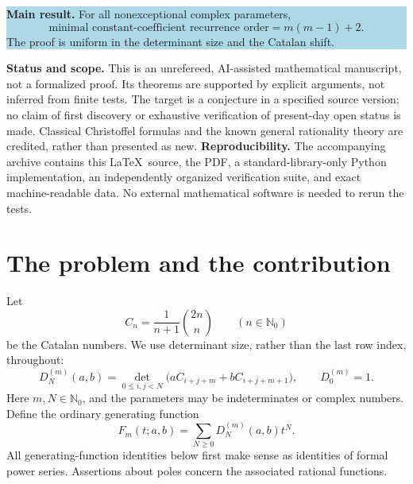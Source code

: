 \documentclass[11pt,a4paper]{article}
\numberwithin{equation}{section}
\theoremstyle{definition}
\theoremstyle{remark}
\newcommand{\NN}{\mathbb N_0}
\newcommand{\D}[2]{D_{#1}^{(#2)}}
\begin{document}
\vspace{1mm}
\noindent\colorbox{lightblue}{\parbox{\dimexpr\textwidth-2\fboxsep\relax}{%
\textbf{Main result.} For all nonexceptional complex parameters,
\[
\boxed{\ \text{minimal constant-coefficient recurrence order}
       =m(m-1)+2.\ }
\]
The proof is uniform in the determinant size and the Catalan shift.
}}\par
\vspace{1mm}
\noindent\textbf{Status and scope.}
This is an unrefereed, AI-assisted mathematical manuscript, not a formalized
proof.  Its theorems are supported by explicit arguments, not inferred from
finite tests.  The target is a conjecture in a specified source version;
no claim of first discovery or exhaustive verification of present-day
open status is made.  Classical Christoffel formulas and the known general
rationality theory are credited, rather than presented as new.
\vfill
\noindent\textbf{Reproducibility.} The accompanying archive contains this
\LaTeX\ source, the PDF, a standard-library-only Python implementation,
an independently organized verification suite, and exact machine-readable
data.  No external mathematical software is needed to rerun the tests.

\clearpage
\begingroup
\small
\setlength{\parskip}{0pt}
\tableofcontents
\endgroup
\clearpage
{}

\section{The problem and the contribution}\label{sec:problem}

Let
\begin{equation}\label{eq:catalan}
 C_n=\frac{1}{n+1}\binom{2n}{n}\qquad(n\in\NN)
\end{equation}
be the Catalan numbers.  We use determinant size, rather than the last row
index, throughout:
\begin{equation}\label{eq:D}
 \D{N}{m}(a,b)=\det_{0\leq i,j<N}
       \bigl(aC_{i+j+m}+bC_{i+j+m+1}\bigr),
 \qquad \D{0}{m}=1.
\end{equation}
Here $m,N\in\NN$, and the parameters may be indeterminates or complex
numbers.  Define the ordinary generating function
\begin{equation}\label{eq:F}
 F_m(t;a,b)=\sum_{N\geq0}\D{N}{m}(a,b)t^N.
\end{equation}
All generating-function identities below first make sense as identities of
formal power series.  Assertions about poles concern the associated
rational functions.
\end{document}
